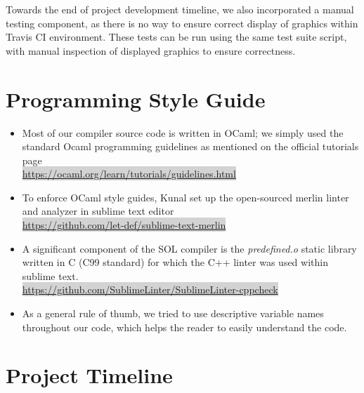 \documentclass[letterpaper,12pt]{report}
\begin{document}
      Towards the end of project development timeline, we also incorporated a manual testing component, as there is no way to ensure correct display of graphics within Travis CI environment. These tests can be run using the same test suite script, with manual inspection of displayed graphics to ensure correctness.\\

  \section{Programming Style Guide}
    \begin{itemize}
      \itemsep 0em
      \item Most of our compiler source code is written in OCaml; we simply used the standard Ocaml programming guidelines as mentioned on the official tutorials page\\
      \colorbox{lightgray}{\href{https://ocaml.org/learn/tutorials/guidelines.html}{https://ocaml.org/learn/tutorials/guidelines.html}}

      \item To enforce OCaml style guides, Kunal set up the open-sourced merlin linter and analyzer in sublime text editor\\
      \colorbox{lightgray}{\href{https://github.com/let-def/sublime-text-merlin}{https://github.com/let-def/sublime-text-merlin}}

      \item A significant component of the SOL compiler is the \textit{predefined.o} static library written in C (C99 standard) for which the C++ linter was used within sublime text.\\
      \colorbox{lightgray}{\href{ https://github.com/SublimeLinter/SublimeLinter-cppcheck}{ https://github.com/SublimeLinter/SublimeLinter-cppcheck}}

      \item As a general rule of thumb, we tried to use descriptive variable names throughout our code, which helps the reader to easily understand the code.
    \end{itemize}

  \section{Project Timeline}
\end{document}

